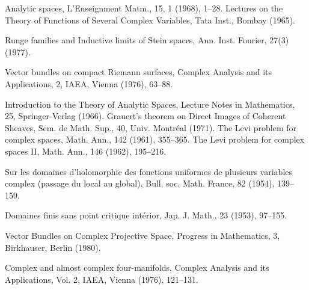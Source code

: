 \begin{sourcebibliography}
 Analytic spaces, L'Enseignment Matm., 15, 1 (1968), 1--28.
 Lectures on the Theory of Functions of Several Complex Variables, Tata Inst., Bombay (1965).
\end{sourcebibliography}
\begin{sourcebibliography}
 Runge families and Inductive limits of Stein spaces, Ann. Inst. Fourier, 27(3) (1977).
\end{sourcebibliography}
\begin{sourcebibliography}
 Vector bundles on compact Riemann surfaces, Complex Analysis and its Applications, 2, IAEA, Vienna (1976), 63--88.
\end{sourcebibliography}
\begin{sourcebibliography}
 Introduction to the Theory of Analytic Spaces, Lecture Notes in Mathematics, 25, Springer-Verlag (1966).
 Grauert's theorem on Direct Images of Coherent Sheaves, Sem. de Math. Sup., 40, Univ. Montr\'eal (1971).
 The Levi problem for complex spaces, Math. Ann., 142 (1961), 355--365.
 The Levi problem for complex spaces II, Math. Ann., 146 (1962), 195--216.
\end{sourcebibliography}
\begin{sourcebibliography}
 Sur les domaines d'holomorphie des fonctions uniformes de plusieurs variables complex (passage du local au global), Bull. soc. Math. France, 82 (1954), 139--159.
\end{sourcebibliography}
\begin{sourcebibliography}
 Domaines finis sans point critique int\'erior, Jap. J. Math., 23 (1953), 97--155.
\end{sourcebibliography}
\begin{sourcebibliography}
 Vector Bundles on Complex Projective Space, Progress in Mathematics, 3, Birkhauser, Berlin (1980).
\end{sourcebibliography}
\begin{sourcebibliography}
 Complex and almost complex four-manifolds, Complex Analysis and its Applications, Vol. 2, IAEA, Vienna (1976), 121--131.
\end{sourcebibliography}
